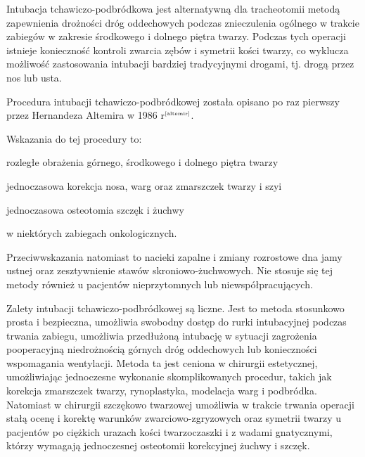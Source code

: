\documentclass[a4paper, 12pt]{report}
\newcommand\cyt[1]{$^{\tiny{\cite{#1}}}$}
\begin{document}
Intubacja tchawiczo-podbródkowa jest alternatywną dla tracheotomii
metodą zapewnienia drożności dróg oddechowych podczas znieczulenia
ogólnego w trakcie zabiegów w zakresie środkowego i dolnego piętra
twarzy. Podczas tych operacji istnieje konieczność kontroli zwarcia
zębów i symetrii kości twarzy, co wyklucza możliwość zastosowania
intubacji bardziej tradycyjnymi drogami, tj. drogą przez nos lub usta.

Procedura intubacji tchawiczo-podbródkowej została opisano po raz
pierwszy przez Hernandeza Altemira w 1986 r\cyt{altemir}. %

Wskazania do tej procedury to:
\begin{inparaenum}
\item rozległe obrażenia górnego, środkowego i dolnego piętra twarzy
\item jednoczasowa korekcja nosa, warg oraz zmarszczek twarzy i szyi 
\item jednoczasowa osteotomia szczęk i żuchwy
\item w niektórych zabiegach onkologicznych. 
\end{inparaenum}
Przeciwwskazania natomiast to nacieki zapalne i zmiany rozrostowe dna
jamy ustnej oraz zesztywnienie stawów skroniowo-żuchwowych. Nie
stosuje się tej metody również u pacjentów nieprzytomnych lub
niewspółpracujących.

Zalety intubacji tchawiczo-podbródkowej są liczne. Jest to metoda
stosunkowo prosta i bezpieczna, umożliwia swobodny dostęp do rurki
intubacyjnej podczas trwania zabiegu, umożliwia przedłużoną intubację
w sytuacji zagrożenia pooperacyjną niedrożnością górnych dróg
oddechowych lub konieczności wspomagania wentylacji. Metoda ta jest
ceniona w chirurgii estetycznej, umożliwiając jednoczesne wykonanie
skomplikowanych procedur, takich jak korekcja zmarszczek twarzy,
rynoplastyka, modelacja warg i podbródka. Natomiast w chirurgii
szczękowo twarzowej umożliwia w trakcie trwania operacji stałą ocenę i
korektę warunków zwarciowo-zgryzowych oraz symetrii twarzy u pacjentów
po ciężkich urazach kości twarzoczaszki i z wadami gnatycznymi, którzy
wymagają jednoczesnej osteotomii korekcyjnej żuchwy i szczęk.
\end{document}
